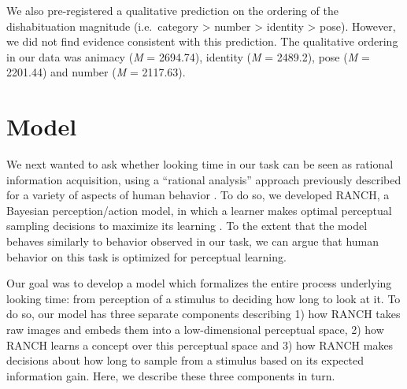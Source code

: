 \documentclass[10pt, letterpaper]{article}
\begin{document}
We also pre-registered a qualitative prediction on the ordering of the
dishabituation magnitude (i.e.~category \textgreater{} number
\textgreater{} identity \textgreater{} pose). However, we did not find
evidence consistent with this prediction. The qualitative ordering in
our data was animacy (\emph{M} = 2694.74), identity (\emph{M} = 2489.2),
pose (\emph{M} = 2201.44) and number (\emph{M} = 2117.63).

\hypertarget{model}{%
\section{Model}\label{model}}

We next wanted to ask whether looking time in our task can be seen as
rational information acquisition, using a ``rational analysis'' approach
previously described for a variety of aspects of human behavior
\cite{chater, dubey}. To do so, we developed RANCH, a Bayesian
perception/action model, in which a learner makes optimal perceptual
sampling decisions to maximize its learning
\cite{cao2023habituation, raz2023modeling}. To the extent that the model
behaves similarly to behavior observed in our task, we can argue that
human behavior on this task is optimized for perceptual learning.

Our goal was to develop a model which formalizes the entire process
underlying looking time: from perception of a stimulus to deciding how
long to look at it. To do so, our model has three separate components
describing 1) how RANCH takes raw images and embeds them into a
low-dimensional perceptual space, 2) how RANCH learns a concept over
this perceptual space and 3) how RANCH makes decisions about how long to
sample from a stimulus based on its expected information gain. Here, we
describe these three components in turn.
\end{document}
